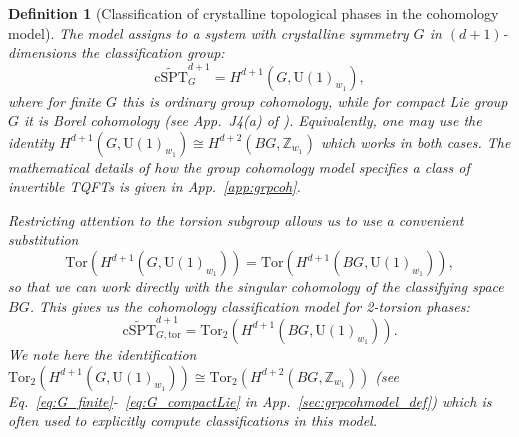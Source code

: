 \documentclass[aps,prx,reprint,superscriptaddress,twocolumn,amsmath,amssymb,amsfonts, nofootinbib]{revtex4-2}
\newcommand{\U}{\text{U}}
\newcommand{\tcspt}{\widetilde{\text{cSPT}}^{d+1}_{G}}
\newcommand{\tor}{\text{Tor}}
\newcommand{\Z}{\mathbb{Z}}
\theoremstyle{apsstyle}
\newtheorem{definition}[theorem]{Definition}
\begin{document}
\bigskip

\begin{definition}[Classification of crystalline topological phases in the cohomology model]
\label{def:grpcoh_classmodel}
The model assigns to a system with crystalline symmetry $G$ in $(d+1)$-dimensions the classification group:
\begin{equation}
    \tcspt = H^{d+1}(G, \U(1)_{w_1}),
    \label{eq:grpcoh_fullclass}
\end{equation}
\noindent where for finite $G$ this is ordinary group cohomology, while for compact Lie group $G$ it is Borel cohomology (see App.~J4(a) of \cite{Chen2013}). Equivalently, one may use the identity $H^{d+1}(G,\U(1)_{w_{1}})\cong H^{d+2}(BG,\mathbb Z_{w_{1}})$ which works in both cases. The mathematical details of how the group cohomology model specifies a class of invertible TQFTs is given in App.~\ref{app:grpcoh}. 

\bigskip 

Restricting attention to the torsion subgroup allows us to use a convenient substitution
\begin{equation}
    \tor(H^{d+1}(G, \U(1)_{w_{1}})) = \tor(H^{d+1}(BG, \U(1)_{w_{1}})),
    \label{eq:tor_equiv_first}
\end{equation}
so that we can work directly with the singular cohomology of the classifying space $BG$. This gives us the cohomology classification model for 2-torsion phases:
\begin{equation}
\widetilde{\mathrm{cSPT}}^{d+1}_{G,\mathrm{tor}} =  \tor_{2}(H^{d+1}(BG, \U(1)_{w_{1}})).
    \label{eq:grpcohtormodel}
\end{equation}
We note here the identification $\tor_{2}(H^{d+1}(G, \U(1)_{w_{1}})) \cong \tor_{2}(H^{d+2}(BG, \Z_{w_{1}}))$ (see Eq.~\ref{eq:G_finite}-~\ref{eq:G_compactLie} in App.~\ref{sec:grpcohmodel_def}) which is often used to explicitly compute classifications in this model.
\end{definition}

\medskip 
\end{document}
